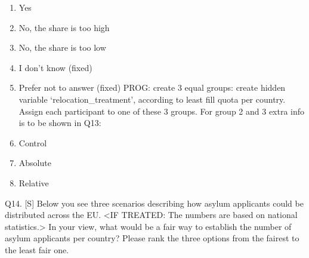 \documentclass[
  12pt,
  a4paper,
]{article}
\providecommand{\tightlist}{%
  \setlength{\itemsep}{0pt}\setlength{\parskip}{0pt}}
\begin{document}
\begin{enumerate}
\def\labelenumi{\arabic{enumi}.}
\tightlist
\item
  Yes
\item
  No, the share is too high\\
\item
  No, the share is too low
\item
  I don't know (fixed)
\item
  Prefer not to answer (fixed)
  PROG: create 3 equal groups: create hidden variable `relocation\_treatment', according to least fill quota per country. Assign each participant to one of these 3 groups. For group 2 and 3 extra info is to be shown in Q13:
\item
  Control
\item
  Absolute
\item
  Relative
\end{enumerate}

Q14. {[}S{]} Below you see three scenarios describing how asylum applicants could be distributed across the EU. \textless IF TREATED: The numbers are based on national statistics.\textgreater{} In your view, what would be a fair way to establish the number of asylum applicants per country? Please rank the three options from the fairest to the least fair one.\\
\end{document}
